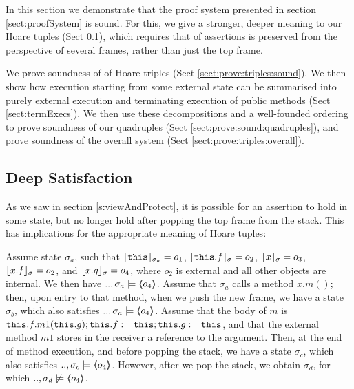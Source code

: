 

In this section we demonstrate that the proof system presented in section \ref{sect:proofSystem} is sound. 
For this, we give a stronger, deeper meaning to our Hoare tuples  (Sect \ref{s:deep:valid}), which requires that  of assertions is preserved from the perspective of several frames, rather than just the top frame.

We prove soundness of of Hoare triples (Sect \ref{sect:prove:triples:sound}).
We then show how execution starting from some external state can be summarised into purely external execution and terminating execution of public methods (Sect \ref{sect:termExecs}). We then use these decompositions and a well-founded ordering to prove soundness of our quadruples  (Sect \ref{sect:prove:sound:quadruples}), and %
 prove soundness of the overall system  (Sect \ref{sect:prove:triples:overall}). 



\subsection{Deep Satisfaction} 
\label{s:deep:valid}

As we saw in section \ref{s:viewAndProtect}, it is possible  for an assertion to hold in some state,  but no longer hold after popping the top frame from the stack. 
This has implications for the appropriate meaning of Hoare tuples:

\begin{example}
Assume state $\sigma_a$, such that $\interpret {\sigma_a} {\prg{this}}=o_1$, $\interpret {\sigma} {\prg{this}.f}=o_2$, $\interpret {\sigma} {x}=o_3$, $\interpret {\sigma} {x.f}=o_2$,  
and $\interpret {\sigma} {x.g}=o_4$, where $o_2$ is external and all other objects are internal. 
We then have $..,\sigma_a \models  \inside {o_4}$.
Assume that $\sigma_a$   calls a method $x.m()$; then,
upon entry to that method, when we push the new frame, we have a state $\sigma_b$, which also satisfies $..,\sigma_a \models  \inside {o_4}$.
Assume that the   body of $m$ is $\prg{this}.f.m1(\prg{this}.g); \prg{this}.f := \prg{this};  \prg{this}.g := \prg{this}$, and that the external method $m1$ stores in the 
receiver a reference to the argument.
Then, at the end of method execution, and before popping the stack, we have a state $\sigma_c$, which also satisfies $..,\sigma_c \models  \inside {o_4}$.
However, after we pop the stack, we obtain $\sigma_d$, for which $..,\sigma_d \not\models  \inside {o_4}$.
\end{example}
 

